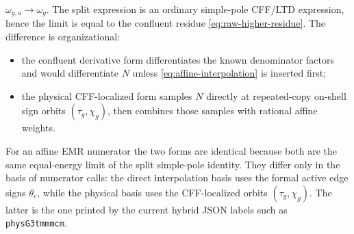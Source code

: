 \documentclass[11pt,a4paper]{report}
\begin{document}
\(\omega_{g,a}\to\omega_g\).  The split expression is an ordinary simple-pole
CFF/LTD expression, hence the limit is equal to the confluent residue
\eqref{eq:raw-higher-residue}.  The difference is organizational:
\begin{itemize}[leftmargin=2em]
  \item the confluent derivative form differentiates the known denominator
        factors and would differentiate \(N\) unless
        \eqref{eq:affine-interpolation} is inserted first;
  \item the physical CFF-localized form samples \(N\) directly at repeated-copy
        on-shell sign orbits \((\tau_g,\chi_g)\), then combines those samples
        with rational affine weights.
\end{itemize}
For an affine EMR numerator the two forms are identical because both are the
same equal-energy limit of the split simple-pole identity.  They differ only in
the basis of numerator calls: the direct interpolation basis uses the formal
active edge signs \(\theta_e\), while the physical basis uses the CFF-localized
orbits \((\tau_g,\chi_g)\).  The latter is the one printed by the current
hybrid JSON labels such as \texttt{physG3tmmmcm}.
\end{document}
